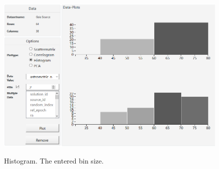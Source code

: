 \documentclass{article}
\begin{document}
\begin{figure}[!h]
\centering
\includegraphics[width=1\textwidth]{images/m3/histogram2.PNG}
\label{fig3}
\caption{Histogram. The entered bin size.}
\end{figure}
\newpage
\end{document}
